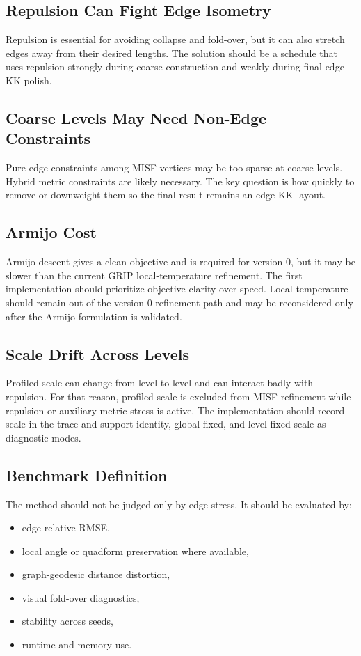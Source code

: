 \documentclass[11pt]{article}
\begin{document}
\subsection{Repulsion Can Fight Edge Isometry}

Repulsion is essential for avoiding collapse and fold-over, but it can also
stretch edges away from their desired lengths. The solution should be a schedule
that uses repulsion strongly during coarse construction and weakly during final
edge-KK polish.

\subsection{Coarse Levels May Need Non-Edge Constraints}

Pure edge constraints among MISF vertices may be too sparse at coarse levels.
Hybrid metric constraints are likely necessary. The key question is how quickly
to remove or downweight them so the final result remains an edge-KK layout.

\subsection{Armijo Cost}

Armijo descent gives a clean objective and is required for version 0, but it
may be slower than the current GRIP local-temperature refinement. The first
implementation should prioritize objective clarity over speed. Local
temperature should remain out of the version-0 refinement path and may be
reconsidered only after the Armijo formulation is validated.

\subsection{Scale Drift Across Levels}

Profiled scale can change from level to level and can interact badly with
repulsion. For that reason, profiled scale is excluded from MISF refinement
while repulsion or auxiliary metric stress is active. The implementation should
record scale in the trace and support identity, global fixed, and level fixed
scale as diagnostic modes.

\subsection{Benchmark Definition}

The method should not be judged only by edge stress. It should be evaluated by:
\begin{itemize}[leftmargin=2em]
  \item edge relative RMSE,
  \item local angle or quadform preservation where available,
  \item graph-geodesic distance distortion,
  \item visual fold-over diagnostics,
  \item stability across seeds,
  \item runtime and memory use.
\end{itemize}
\end{document}
